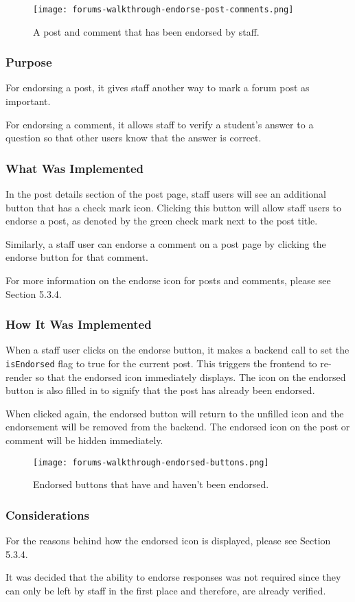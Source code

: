 \begin{figure}[h!]
    \texttt{[image: forums-walkthrough-endorse-post-comments.png]}
    \centering
    \caption{A post and comment that has been endorsed by staff.}
\end{figure}

\subsubsection{Purpose}
For endorsing a post, it gives staff another way to mark a forum post as important.

For endorsing a comment, it allows staff to verify a student's answer to a question so that other users know that the answer is correct.

\subsubsection{What Was Implemented}
In the post details section of the post page, staff users will see an additional button that has a check mark icon.
Clicking this button will allow staff users to endorse a post, as denoted by the green check mark next to the post title.

Similarly, a staff user can endorse a comment on a post page by clicking the endorse button for that comment.

For more information on the endorse icon for posts and comments, please see Section 5.3.4.

\subsubsection{How It Was Implemented}
When a staff user clicks on the endorse button, it makes a backend call to set the \texttt{isEndorsed} flag to true for the current post.
This triggers the frontend to re-render so that the endorsed icon immediately displays.
The icon on the endorsed button is also filled in to signify that the post has already been endorsed.

When clicked again, the endorsed button will return to the unfilled icon and the endorsement will be removed from the backend.
The endorsed icon on the post or comment will be hidden immediately.

\begin{figure}[h!]
    \texttt{[image: forums-walkthrough-endorsed-buttons.png]}
    \centering
    \caption{Endorsed buttons that have and haven't been endorsed.}
\end{figure}

\subsubsection{Considerations}
For the reasons behind how the endorsed icon is displayed, please see Section 5.3.4.

It was decided that the ability to endorse responses was not required since they can only be left by staff in the first place and therefore, are already verified.